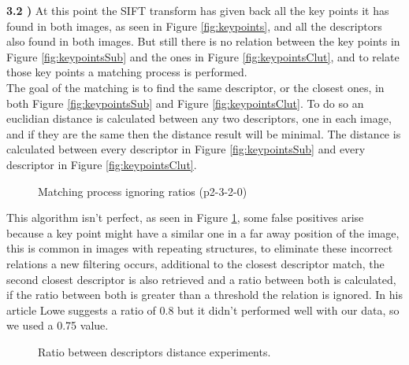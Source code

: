 \documentclass[12pt,a4paper]{article}
\begin{document}
\textbf{3.2 )} At this point the SIFT transform has given back all the key points it has found in both images, as seen in Figure \ref{fig:keypoints}, and all the descriptors also found in both images. But still there is no relation between the key points in Figure \ref{fig:keypointsSub} and the ones in Figure \ref{fig:keypointsClut}, and to relate those key points a matching process is performed. \\

The goal of the matching is to find the same descriptor, or the closest ones, in both Figure \ref{fig:keypointsSub} and Figure \ref{fig:keypointsClut}. To do so an euclidian distance is calculated between any two descriptors, one in each image, and if they are the same then the distance result will be minimal. The distance is calculated between every descriptor in Figure \ref{fig:keypointsSub} and every descriptor in Figure \ref{fig:keypointsClut}. \\

\begin{figure}[!h]
	\centering
		{
			\setlength{\fboxsep}{1pt}
			\setlength{\fboxrule}{1pt}
		}
	\caption{Matching process ignoring ratios (p2-3-2-0)}
	\label{fig:noRatio}
\end{figure}
	
	This algorithm isn't perfect, as seen in Figure \ref{fig:noRatio}, some false positives arise because a key point might have a similar one in a far away position of the image, this is common in images with repeating structures, to eliminate these incorrect relations a new filtering occurs, additional to the closest descriptor match, the second closest descriptor is also retrieved and a ratio between both is calculated, if the ratio between both is greater than a threshold the relation is ignored. In his article Lowe suggests a ratio of 0.8 but it didn't performed well with our data, so we used a 0.75 value. \\

\begin{figure}[!h]
	\centering
	\quad
	\caption{Ratio between descriptors distance experiments.}
	\label{fig:matchRatio}
\end{figure}
\end{document}
